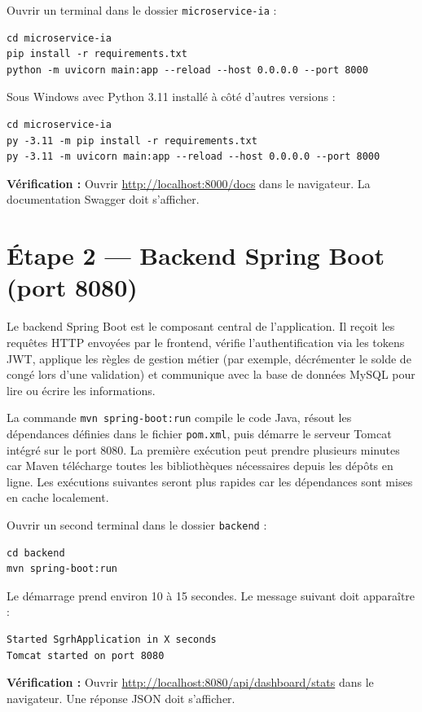 \documentclass[12pt,a4paper]{report}
\begin{document}
Ouvrir un terminal dans le dossier \texttt{microservice-ia} :

\begin{verbatim}
cd microservice-ia
pip install -r requirements.txt
python -m uvicorn main:app --reload --host 0.0.0.0 --port 8000
\end{verbatim}

Sous Windows avec Python 3.11 installé à côté d'autres versions :
\begin{verbatim}
cd microservice-ia
py -3.11 -m pip install -r requirements.txt
py -3.11 -m uvicorn main:app --reload --host 0.0.0.0 --port 8000
\end{verbatim}

\textbf{Vérification :} Ouvrir \url{http://localhost:8000/docs} dans le navigateur. La documentation Swagger doit s'afficher.

\section{Étape 2 — Backend Spring Boot (port 8080)}

Le backend Spring Boot est le composant central de l'application. Il reçoit les requêtes HTTP envoyées par le frontend, vérifie l'authentification via les tokens JWT, applique les règles de gestion métier (par exemple, décrémenter le solde de congé lors d'une validation) et communique avec la base de données MySQL pour lire ou écrire les informations.

La commande \texttt{mvn spring-boot:run} compile le code Java, résout les dépendances définies dans le fichier \texttt{pom.xml}, puis démarre le serveur Tomcat intégré sur le port 8080. La première exécution peut prendre plusieurs minutes car Maven télécharge toutes les bibliothèques nécessaires depuis les dépôts en ligne. Les exécutions suivantes seront plus rapides car les dépendances sont mises en cache localement.

Ouvrir un second terminal dans le dossier \texttt{backend} :

\begin{verbatim}
cd backend
mvn spring-boot:run
\end{verbatim}

Le démarrage prend environ 10 à 15 secondes. Le message suivant doit apparaître :
\begin{verbatim}
Started SgrhApplication in X seconds
Tomcat started on port 8080
\end{verbatim}

\textbf{Vérification :} Ouvrir \url{http://localhost:8080/api/dashboard/stats} dans le navigateur. Une réponse JSON doit s'afficher.
\end{document}
